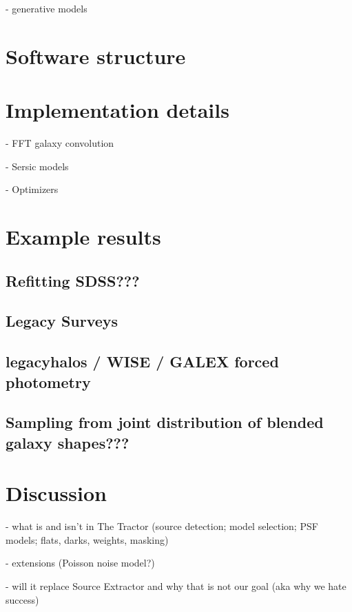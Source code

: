 \documentclass[modern, linenumbers]{aastex631}
\begin{document}
- generative models

\cite{2009AJ....137.4400L}

\section{Software structure}

\section{Implementation details}

- FFT galaxy convolution

- Sersic models

- Optimizers

\section{Example results}

\subsection{Refitting SDSS???}

\subsection{Legacy Surveys}

\subsection{legacyhalos / WISE / GALEX forced photometry}

\subsection{Sampling from joint distribution of blended galaxy shapes???}


\section{Discussion}

- what is and isn't in The Tractor (source detection; model selection; PSF models; flats, darks, weights, masking)

- extensions (Poisson noise model?)

- will it replace Source Extractor and why that is not our goal (aka why we hate success)



\software{%
          }


{}

\end{document}
